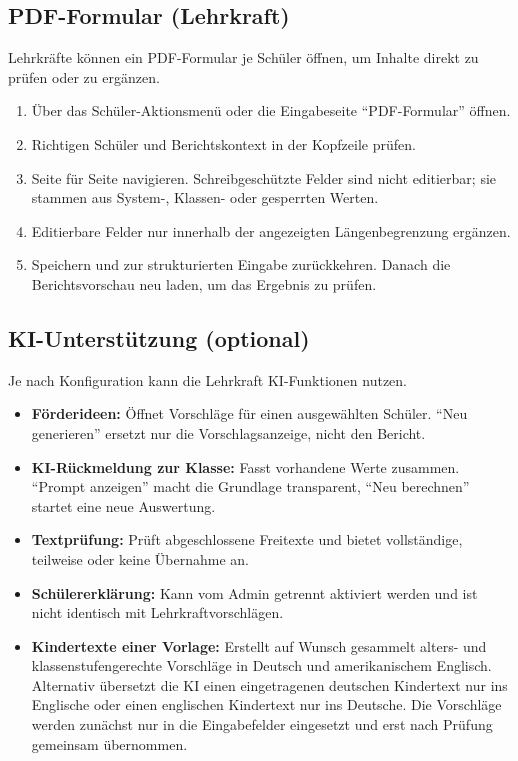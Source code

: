 \documentclass[12pt,a4paper]{article}
\begin{document}
\subsection{PDF-Formular (Lehrkraft)}
Lehrkräfte können ein PDF-Formular je Schüler öffnen, um Inhalte direkt zu prüfen oder zu ergänzen.
\begin{enumerate}
  \item Über das Schüler-Aktionsmenü oder die Eingabeseite \enquote{PDF-Formular} öffnen.
  \item Richtigen Schüler und Berichtskontext in der Kopfzeile prüfen.
  \item Seite für Seite navigieren. Schreibgeschützte Felder sind nicht editierbar; sie stammen aus System-, Klassen- oder gesperrten Werten.
  \item Editierbare Felder nur innerhalb der angezeigten Längenbegrenzung ergänzen.
  \item Speichern und zur strukturierten Eingabe zurückkehren. Danach die Berichtsvorschau neu laden, um das Ergebnis zu prüfen.
\end{enumerate}

\subsection{KI-Unterstützung (optional)}
Je nach Konfiguration kann die Lehrkraft KI-Funktionen nutzen.
\begin{itemize}
  \item \textbf{Förderideen:} Öffnet Vorschläge für einen ausgewählten Schüler. \enquote{Neu generieren} ersetzt nur die Vorschlagsanzeige, nicht den Bericht.
  \item \textbf{KI-Rückmeldung zur Klasse:} Fasst vorhandene Werte zusammen. \enquote{Prompt anzeigen} macht die Grundlage transparent, \enquote{Neu berechnen} startet eine neue Auswertung.
  \item \textbf{Textprüfung:} Prüft abgeschlossene Freitexte und bietet vollständige, teilweise oder keine Übernahme an.
  \item \textbf{Schülererklärung:} Kann vom Admin getrennt aktiviert werden und ist nicht identisch mit Lehrkraftvorschlägen.
  \item \textbf{Kindertexte einer Vorlage:} Erstellt auf Wunsch gesammelt alters- und klassenstufengerechte Vorschläge in Deutsch und amerikanischem Englisch. Alternativ übersetzt die KI einen eingetragenen deutschen Kindertext nur ins Englische oder einen englischen Kindertext nur ins Deutsche. Die Vorschläge werden zunächst nur in die Eingabefelder eingesetzt und erst nach Prüfung gemeinsam übernommen.
\end{itemize}
\end{document}
